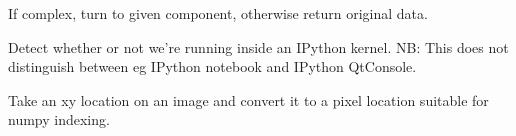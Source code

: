 \documentclass[letterpaper,10pt,english]{sphinxmanual}
\begin{document}

\begin{fulllineitems}
\label{\detokenize{xanespy:xanespy.utilities.get_component}}
If complex, turn to given component, otherwise return original data.

\end{fulllineitems}


\begin{fulllineitems}
\label{\detokenize{xanespy:xanespy.utilities.is_kernel}}
Detect whether or not we’re running inside an IPython kernel. NB:
This does not distinguish between eg IPython notebook and IPython
QtConsole.

\end{fulllineitems}


\begin{fulllineitems}
\label{\detokenize{xanespy:xanespy.utilities.parallel_map}}
\end{fulllineitems}


\begin{fulllineitems}
\label{\detokenize{xanespy:xanespy.utilities.pixel_to_xy}}
Take an xy location on an image and convert it to a pixel location
suitable for numpy indexing.

\end{fulllineitems}

\end{document}

